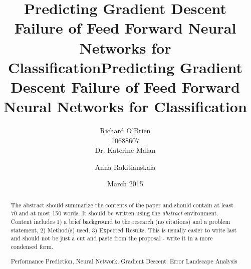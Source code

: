 \documentclass[runningheads,a4paper]{llncs}
\newcommand{\keywords}[1]{\par\addvspace\baselineskip
\noindent\keywordname\enspace\ignorespaces#1}
\begin{document}
\mainmatter  %

\title{Predicting Gradient Descent Failure of Feed Forward Neural Networks for Classification}



%
%
\author{Richard O'Brien \\ 10688607 \\
Dr. Katerine Malan\and Anna Rakitianskaia}



%
%

\date{March 2015}
\newpage

\title{Predicting Gradient Descent Failure of Feed Forward Neural Networks for Classification}
\author{}
\institute{}

\maketitle

\begin{abstract}
The abstract should summarize the contents of the paper and should
contain at least 70 and at most 150 words. It should be written using the
\emph{abstract} environment. Content includes 1) a brief background to the research (no citations) and
a problem statement, 2) Method(s) used, 3) Expected Results. This is usually easier to write last and
should not be just a cut and paste from the proposal - write it in a more condensed form.

\keywords{Performance Prediction, Neural Network, Gradient Descent, Error Landscape Analysis}
\end{abstract}
\end{document}
